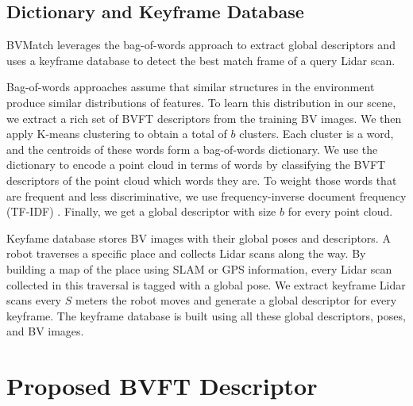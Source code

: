 \documentclass[letterpaper, 10 pt, journal, twoside]{IEEEtran}
\begin{document}
\subsection{Dictionary and Keyframe Database}

BVMatch leverages the bag-of-words approach to extract global descriptors and uses a keyframe database to detect the best match frame of a query Lidar scan.

Bag-of-words approaches assume that similar structures in the environment produce similar distributions of features. To learn this distribution in our scene, we extract a rich set of BVFT descriptors from the training BV images. We then apply K-means clustering to obtain a total of $b$ clusters. Each cluster is a word, and the centroids of these words form a bag-of-words dictionary. We use the dictionary to encode a point cloud in terms of words by classifying the BVFT descriptors of the point cloud which words they are. To weight those words that are frequent and less discriminative, we use frequency-inverse document frequency (TF-IDF) \cite{nister2006scalable}. Finally, we get a global descriptor with size $b$ for every point cloud.

Keyfame database stores BV images with their global poses and descriptors. A robot traverses a specific place and collects Lidar scans along the way. By building a map of the place using SLAM or GPS information, every Lidar scan collected in this traversal is tagged with a global pose. We extract keyframe Lidar scans every $S$ meters the robot moves and generate a global descriptor for every keyframe. The keyframe database is built using all these global descriptors, poses, and BV images.



\section{Proposed BVFT Descriptor}
\end{document}
